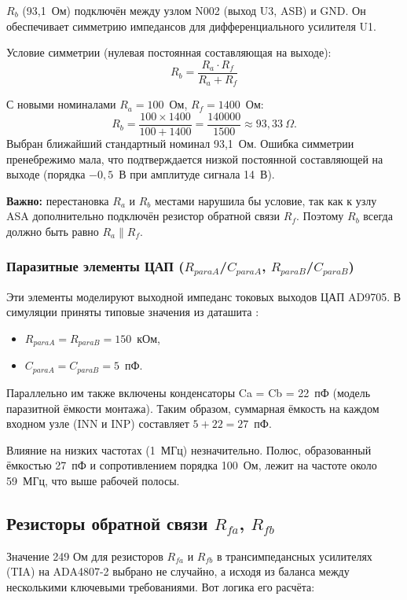\documentclass[a4paper, 12pt]{article}
\begin{document}
\textbf{\(R_{b}\)} (93{,}1~Ом) подключён между узлом N002 (выход U3, ASB)
и GND. Он обеспечивает симметрию импедансов для дифференциального
усилителя U1.

Условие симметрии (нулевая постоянная составляющая на выходе):
\begin{equation}
  \boxed{R_b = \frac{R_a \cdot R_f}{R_a + R_f}}
  \label{eq:sym}
\end{equation}

С новыми номиналами \(R_a=100\)~Ом, \(R_f=1400\)~Ом:
\[
    R_b = \frac{100 \times 1400}{100+1400} = \frac{140000}{1500}
    \approx 93{,}33\ \Omega.
\]
Выбран ближайший стандартный номинал 93{,}1~Ом.
Ошибка симметрии пренебрежимо мала, что подтверждается низкой
постоянной составляющей на выходе (порядка \(-0{,}5\)~В при
амплитуде сигнала 14~В).

\textbf{Важно:} перестановка \(R_{a}\) и \(R_{b}\) местами нарушила бы
условие, так как к узлу ASA дополнительно подключён резистор
обратной связи \(R_f\). Поэтому \(R_b\) всегда должно быть равно
\(R_a \parallel R_f\).

\subsubsection{Паразитные элементы ЦАП (\texorpdfstring{\(R_{paraA}\)/\(C_{paraA}\), \(R_{paraB}\)/\(C_{paraB}\)}{Rpara/Cpara})}

Эти элементы моделируют выходной импеданс токовых выходов ЦАП AD9705.
В симуляции приняты типовые значения из даташита \cite{AD9705_ds}:
\begin{itemize}
    \item \(R_{paraA} = R_{paraB} = 150\)~кОм,
    \item \(C_{paraA} = C_{paraB} = 5\)~пФ.
\end{itemize}
Параллельно им также включены конденсаторы Ca = Cb = 22~пФ (модель
паразитной ёмкости монтажа). Таким образом, суммарная ёмкость на каждом
входном узле (INN и INP) составляет \(5+22 = 27\)~пФ.

Влияние на низких частотах (1~МГц) незначительно. Полюс,
образованный ёмкостью 27~пФ и сопротивлением порядка 100~Ом,
лежит на частоте около 59~МГц, что выше рабочей полосы.

\subsection{Резисторы обратной связи \texorpdfstring{\(R_{fa}\), \(R_{fb}\)}{Rfa, Rfb}}
\par Значение 249 Ом для резисторов \(R_{fa}\) и \(R_{fb}\) в трансимпедансных усилителях (TIA) на ADA4807-2 выбрано не случайно, а исходя из баланса между несколькими ключевыми требованиями. Вот логика его расчёта:
\end{document}
